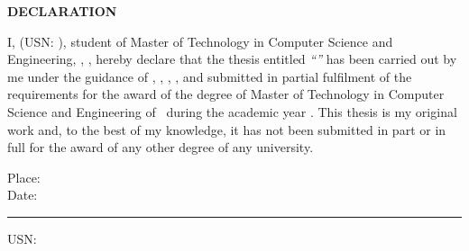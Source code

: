 \clearpage
\thispagestyle{plain}
\begin{center}
{\Large\bfseries DECLARATION\par}
\end{center}
\vspace{6mm}

I, \textbf{\candidatename} (USN: \candidateusn), student of Master of
Technology in Computer Science and Engineering, \collegename, \collegecity,
hereby declare that the thesis entitled \emph{``\thesistitle''} has been
carried out by me under the guidance of \textbf{\guidename}, \guidedesig,
\deptname, \collegename, and submitted in partial fulfilment of the
requirements for the award of the degree of Master of Technology in Computer
Science and Engineering of \university\ during the academic year
\academicyear. This thesis is my original work and, to the best of my
knowledge, it has not been submitted in part or in full for the award of any
other degree of any university.

\vspace{25mm}
\noindent Place: \collegecity\hfill \textbf{\candidatename}\\
Date: \rule{3cm}{0.4pt}\hfill USN: \candidateusn
